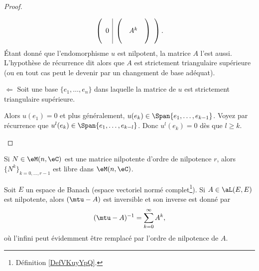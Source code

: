 \begin{proof}
\begin{subproof}
\begin{equation}
\begin{pmatrix}
\begin{array}[]{c|c}
\begin{matrix}
						0
					\end{matrix} &
					\begin{pmatrix}
						 &     & \\
						 & A^k & \\
						 &     &
					\end{pmatrix}
				\end{array}
			\end{pmatrix}.
		\end{equation}
		Étant donné que l'endomorphisme \( u\) est nilpotent, la matrice \( A\) l'est aussi. L'hypothèse de récurrence dit alors que \( A\) est strictement triangulaire supérieure (ou en tout cas peut le devenir par un changement de base adéquat).

		\item[\( \Leftarrow\)]
		Soit une base \( \{ e_1,\ldots, e_n \}  \) dans laquelle la matrice de \( u\) est strictement triangulaire supérieure.

		Alors \( u(e_1)=0\) et plus généralement, \( u(e_k)\in \Span\{ e_1,\ldots, e_{k-1} \}\). Voyez par récurrence que \( u^l(e_k)\in \Span\{ e_1,\ldots, e_{k-l} \}\). Donc \( u^l(e_k)=0\) dès que \( l\geq k\).
	\end{subproof}
\end{proof}

\begin{lemma}        \label{LEMooKPWKooOacXju}
	Si \( N\in \eM(n,\eC)\) est une matrice nilpotente d'ordre de nilpotence \( r\), alors \( \{ N^k \}_{k=0,\ldots, r-1}\) est libre dans \( \eM(n,\eC)\).
\end{lemma}

\begin{proposition}     \label{PROPooWTFWooXHlmhp}
	Soit \( E\) un espace de Banach (espace vectoriel normé complet\footnote{Définition \ref{DefVKuyYpQ}.}). Si \( A\in\aL(E,E)\) est nilpotente, alors \( (\mtu-A)\) est inversible et son inverse est donné par
	\begin{equation}
		(\mtu-A)^{-1}=\sum_{k=0}^{\infty}A^k,
	\end{equation}
	où l'infini peut évidemment être remplacé par l'ordre de nilpotence de \( A\).
\end{proposition}

